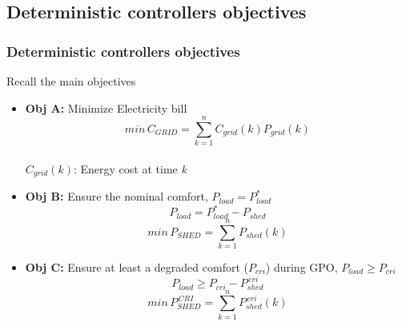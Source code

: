 \documentclass{beamer}
\begin{document}
\subsection{Deterministic controllers objectives}
\begin{frame}
\frametitle{Deterministic controllers objectives}
\vspace{15px}
{\Large Recall the main objectives}
\vspace{-15px}


    \pause

        \vspace{15px}
        \begin{itemize}
            \item \textbf{Obj A:} Minimize Electricity bill 
            \vspace{px}
            $$min\,C_{GRID} = \sum_{k=1}^{n} C_{grid}(k)P_{grid}(k)$$\\ 
            \vspace{-7px} $C_{grid}(k)$: Energy cost at time \textit{k}
            
            \vspace{26px}\pause 
             \item \textbf{Obj B:} Ensure the nominal comfort, $P_{load} = P_{load}^*$
             $$P_{load} = P_{load}^* - P_{shed}$$ \vspace{-15px}
             $$min\,P_{SHED} = \sum_{k=1}^{n} P_{shed}(k)$$ 
    
    
            \item \textbf{Obj C:} Ensure at least a degraded comfort ($P_{cri}$) during GPO, $P_{load} \geq P_{cri}$ 
            $$P_{load} \geq P_{cri}- P_{shed}^{\,cri}$$ \vspace{-15px}
             $$min\,P_{SHED}^{\,CRI} = \sum_{k=1}^{n} P_{shed}^{\,cri}(k)$$ 
        \end{itemize}

\end{frame}
\endgroup
\end{document}
